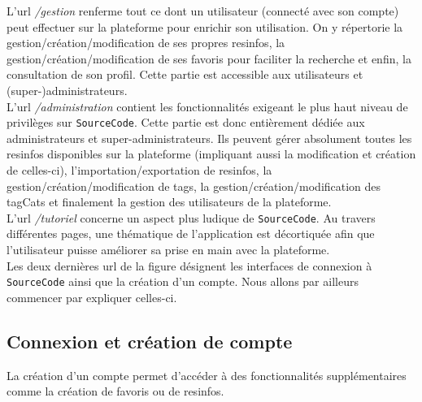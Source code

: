 L'url \textit{/gestion} renferme tout ce dont un utilisateur (connecté avec son compte) peut effectuer sur la plateforme pour enrichir son utilisation. On y répertorie la gestion/création/modification de ses propres \glspl{resinfo}, la gestion/création/modification de ses favoris pour faciliter la recherche et enfin, la consultation de son profil. Cette partie est accessible aux utilisateurs et (super-)administrateurs.\\

L'url \textit{/administration} contient les fonctionnalités exigeant le plus haut niveau de privilèges sur \texttt{SourceCode}. Cette partie est donc entièrement dédiée aux administrateurs et super-administrateurs. Ils peuvent gérer absolument toutes les \glspl{resinfo} disponibles sur la plateforme (impliquant aussi la modification et création de celles-ci), l'importation/exportation de \glspl{resinfo}, la gestion/création/modification de \glspl{tag}, la gestion/création/modification des \glspl{tagCat} et finalement la gestion des utilisateurs de la plateforme.\\

L'url \textit{/tutoriel} concerne un aspect plus ludique de \texttt{SourceCode}. Au travers différentes pages, une thématique de l'application est décortiquée afin que l'utilisateur puisse améliorer sa prise en main avec la plateforme.\\

Les deux dernières url de la figure désignent les interfaces de connexion à \texttt{SourceCode} ainsi que la création d'un compte. Nous allons par ailleurs commencer par expliquer celles-ci.\\

\subsection{Connexion et création de compte}

La création d'un compte permet d'accéder à des fonctionnalités supplémentaires comme la création de favoris ou de \glspl{resinfo}.\\

